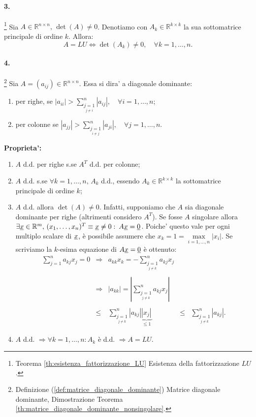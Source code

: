 \paragraph{3.}\footnote{Teorema \ref{th:esistenza_fattorizzazione_LU} Esistenza della fattorizzazione $LU$.} Sia $A\in\mathbb{R}^{n \times n},\, \det(A)\neq 0$. Denotiamo con $A_k\in\mathbb{R}^{k\times k}$ la sua sottomatrice principale di ordine $k$. Allora:
\begin{equation*}
	A = LU \iff \det(A_k)\neq 0,\quad\forall k=1,\hdots, n.
\end{equation*}

\paragraph{4.}\footnote{Definizione (\ref{def:matrice_diagonale_dominante}) Matrice diagonale dominante, Dimostrazione Teorema \ref{th:matrice_diagonale_dominante_nonsingolare}.} Sia $A=(a_{ij})\in\mathbb{R}^{n \times n}$. Essa si dira' a diagonale dominante:
\begin{enumerate}
	\item per righe, se $|a_{ii}|>\sum_{\underset{j\neq i}{j=1}}^n |a_{ij}|,\quad 
	\forall i=1,\hdots, n$;
	\item per colonne se $|a_{jj}|>\sum_{\underset{i\neq j}{j=1}}^n|a_{ji}|,\quad \forall j=1,\hdots,n$.
\end{enumerate}
\textbf{Proprieta':}
\begin{enumerate}
	\item $A$ d.d. per righe s.se $A^T$ d.d. per colonne;
	\item $A$ d.d. s.se $\forall k=1,\hdots, n,\, A_k$ d.d., essendo $A_k\in\mathbb{R}^{k\times k}$ la sottomatrice principale di ordine $k$;
	\item $A$ d.d. allora $\det(A)\neq 0$. Infatti, supponiamo che $A$ sia diagonale dominante per righe (altrimenti considero $A^T$). Se fosse $A$ \gls{singolare} allora $\exists \uline x\in\mathbb{R}^m,\, (x_1,\hdots, x_n)^T\equiv \uline x \neq 0\,\colon\, A\uline x = \uline 0$. Poiche' questo vale per ogni multiplo scalare di $\uline x$, è possibile assumere che $x_k=1=\underset{i=1,\hdots, n}{\max}|x_i|$. Se scriviamo la $k$-esima equazione di $A\uline x=\uline 0$ è ottenuto:
	\begin{equation*}
		\begin{matrix}
			\sum_{j=1}^{n}a_{kj} x_j=0 &\Rightarrow& a_{kk}x_k = -\sum_{\underset{j\neq k}{j=1}}^{n}a_{kj} x_j && \\\\
			&\Rightarrow& |a_{kk}| = \left|\sum_{\underset{j\neq k}{j=1}}^{n}a_{kj} x_j\right| &&\\\\
			&\leq& \sum_{\underset{j\neq k}{j=1}}^{n}|a_{kj}| \underbrace{|x_j|}_{\leq 1} &\leq& \sum_{\underset{j\neq k}{j=1}}^{n}|a_{kj}|.
		\end{matrix}
	\end{equation*}
	\item $A$ d.d. $\Rightarrow\forall k=1,\hdots,n\colon A_k$ è d.d. $\Rightarrow A=LU$.
\end{enumerate}

